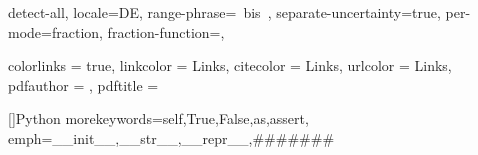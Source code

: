 


\sisetup
{
	detect-all, %
	locale=DE, %
	range-phrase={\ bis\ }, %
	separate-uncertainty=true, %
		per-mode=fraction, %
		fraction-function=\sfrac,
}


\hypersetup
{
	colorlinks	= true,
	linkcolor   = Links, 
	citecolor   = Links,
	urlcolor    = Links,
	pdfauthor   = {\JHPreamble@author},
	pdftitle    = {\JHPreamble@title}%
}



    []{Python} %
{
    morekeywords={self,True,False,as,assert},           
    emph={__init__,__str__,__repr__,\#\#\#\#\#\#\#}
}

\tensorformat{}



